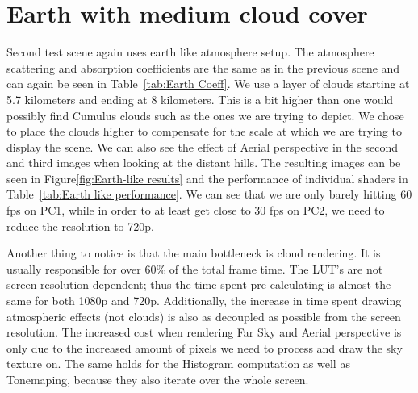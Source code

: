 \documentclass{ctuthesis}
\begin{document}
\section{Earth with medium cloud cover}
Second test scene again uses earth like atmosphere setup. The atmosphere scattering and absorption coefficients are the same as in 
the previous scene and can again be seen in Table~\ref{tab:Earth Coeff}. We use a layer of clouds starting at 5.7 kilometers
and ending at 8 kilometers. This is 
a bit higher than one would possibly find Cumulus clouds such as the ones we are trying to depict. We chose to place the clouds
higher to compensate for the scale at which we are trying to display the scene. We can also see the effect of Aerial perspective
in the second and third images when looking at the distant hills. The resulting images can be seen in Figure\ref{fig:Earth-like results} and the performance of
individual shaders in Table~\ref{tab:Earth like performance}. We can see that we are only barely hitting 60 fps on PC1, while
in order to at least get close to 30 fps on PC2, we need to reduce the resolution to 720p.  


Another thing to notice is that the main bottleneck is cloud rendering. It is usually responsible for over 
60\% of the total frame time. The LUT's are not screen resolution dependent; thus the time spent pre-calculating is 
almost the same for both 1080p and 720p.
Additionally, the increase in time spent drawing atmospheric effects (not clouds) is also as decoupled as possible
from the screen resolution. The increased cost when rendering Far Sky and Aerial perspective is only due to the 
increased amount of pixels we need to process and draw the sky texture on. The same holds for the Histogram computation as well
as Tonemaping, because they also iterate over the whole screen.
\end{document}
